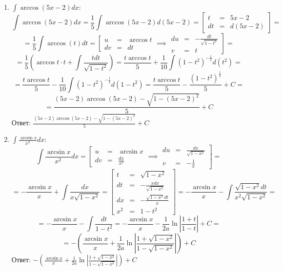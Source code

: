 \documentclass[a4paper,12pt]{article}
\begin{document}
\begin{enumerate}
    \item $\int\arccos(5x - 2)dx$:
    $$\int\arccos(5x - 2)dx = \frac{1}{5}\int\arccos(5x - 2)d(5x - 2) = \left[\begin{array}{rcl}
        t & = & 5x - 2 \\
        dt & = & d(5x - 2)
    \end{array}\right] =$$
    $$= \frac{1}{5}\int\arccos(t)dt = \left[\begin{array}{rcl}
        u & = & \arccos t \\
        dv & = & dt
    \end{array}\right. \implies \left.\begin{array}{rcl}
        du & = & -\frac{dt}{\sqrt{1 - t^2}} \\
        v & = & t
    \end{array}\right] =$$
    $$= \frac{1}{5}\left(\arccos t \cdot t + \int\frac{tdt}{\sqrt{1 -t^2}}\right) = \frac{t\arccos t}{5} + \frac{1}{10}\int(1 - t^2)^{-\frac{1}{2}}d(t^2) =$$
    $$= \frac{t\arccos t}{5} - \frac{1}{10}\int(1 - t^2)^{-\frac{1}{2}}d(1 - t^2) = \frac{t\arccos t}{5} - \frac{(1 - t^2)^{\frac{1}{2}}}{5} + C =$$
    $$= \frac{(5x - 2)\arccos(5x - 2) - \sqrt{1 - (5x - 2)^2}}{5} + C$$
    Ответ: $\frac{(5x - 2)\arccos(5x - 2) - \sqrt{1 - (5x - 2)^2}}{5} + C$

    \item $\int\frac{\arcsin x}{x^2}dx$:
    $$\int\frac{\arcsin x}{x^2}dx = \left[\begin{array}{rcl}
        u & = & \arcsin x \\
        dv & = & \frac{dx}{x^2}
    \end{array}\right. \implies \left.\begin{array}{rcl}
        du & = & \frac{dx}{\sqrt{1 - x^2}} \\
        v & = & -\frac{1}{x} 
    \end{array}\right] =$$
    $$= -\frac{\arcsin x}{x} + \int\frac{dx}{x\sqrt{1 - x^2}} = \left[\begin{array}{rcl}
        t & = & \sqrt{1 - x^2} \\
        dt & = & -\frac{xdx}{\sqrt{1 - x^2}} \\
        dx & = & -\frac{\sqrt{1 - x^2}dt}{x} \\
        x^2 & = & 1 - t^2
    \end{array}\right] = -\frac{\arcsin x}{x} - \int\frac{\sqrt{1 - x^2}dt}{x^2\sqrt{1 - x^2}} = $$
    $$= -\frac{\arcsin x}{x} - \int \frac{dt}{1 - t^2} = -\frac{\arcsin x}{x} - \frac{1}{2a}\ln\left|\frac{1 + t}{1 - t}\right| + C = $$
    $$= -\left(\frac{\arcsin x}{x} + \frac{1}{2a}\ln\left|\frac{1 + \sqrt{1 - x^2}}{1 - \sqrt{1 - x^2}}\right|\right) + C$$
    Ответ: $-\left(\frac{\arcsin x}{x} + \frac{1}{2a}\ln\left|\frac{1 + \sqrt{1 - x^2}}{1 - \sqrt{1 - x^2}}\right|\right) + C$


\end{enumerate}
\end{document}
